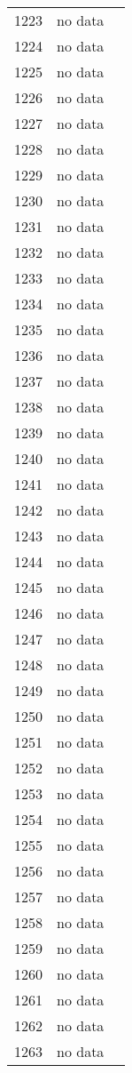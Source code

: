 \begin{table}[p]
\begin{tabular}{rlr}
  1223 & no data &  \\ 
  1224 & no data &  \\ 
  1225 & no data &  \\ 
  1226 & no data &  \\ 
  1227 & no data &  \\ 
  1228 & no data &  \\ 
  1229 & no data &  \\ 
  1230 & no data &  \\ 
  1231 & no data &  \\ 
  1232 & no data &  \\ 
  1233 & no data &  \\ 
  1234 & no data &  \\ 
  1235 & no data &  \\ 
  1236 & no data &  \\ 
  1237 & no data &  \\ 
  1238 & no data &  \\ 
  1239 & no data &  \\ 
  1240 & no data &  \\ 
  1241 & no data &  \\ 
  1242 & no data &  \\ 
  1243 & no data &  \\ 
  1244 & no data &  \\ 
  1245 & no data &  \\ 
  1246 & no data &  \\ 
  1247 & no data &  \\ 
  1248 & no data &  \\ 
  1249 & no data &  \\ 
  1250 & no data &  \\ 
  1251 & no data &  \\ 
  1252 & no data &  \\ 
  1253 & no data &  \\ 
  1254 & no data &  \\ 
  1255 & no data &  \\ 
  1256 & no data &  \\ 
  1257 & no data &  \\ 
  1258 & no data &  \\ 
  1259 & no data &  \\ 
  1260 & no data &  \\ 
  1261 & no data &  \\ 
  1262 & no data &  \\ 
  1263 & no data &  \\ 

\end{tabular}
\end{table}
